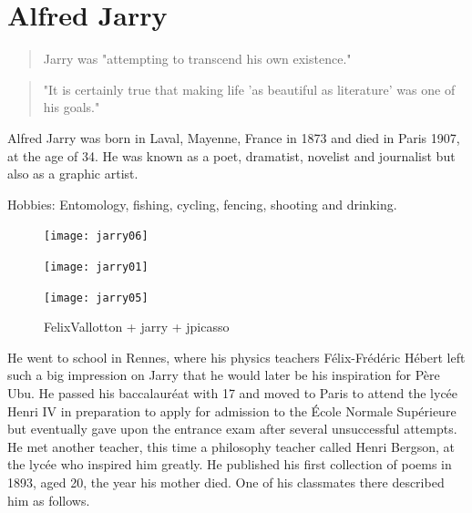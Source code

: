 \section{Alfred Jarry}

\begin{quote}
  Jarry was "attempting to transcend his own existence." \citep{Hugill2012}
\end{quote}

\begin{quote}
  "It is certainly true that making life 'as beautiful as literature' was one of his goals." \citep{Hugill2012}
\end{quote}

Alfred Jarry was born in Laval, Mayenne, France in 1873 and died in Paris 1907, at the age of 34. He was known as a poet, dramatist, novelist and journalist but also as a graphic artist.

Hobbies: Entomology, fishing, cycling, fencing, shooting and drinking.

\begin{figure}[htb]
  \centering
  \begin{minipage}{.275\linewidth}
    \texttt{[image: jarry06]}
  \end{minipage}
  \hspace{.05\linewidth}
  \begin{minipage}{.275\linewidth}
    \texttt{[image: jarry01]}
  \end{minipage}
  \hspace{.05\linewidth}
  \begin{minipage}{.275\linewidth}
    \texttt{[image: jarry05]}
  \end{minipage}
  \caption[figures1-3]{FelixVallotton + jarry + jpicasso}
  \label{img123}
\end{figure}

He went to school in Rennes, where his physics teachers Félix-Frédéric Hébert left such a big impression on Jarry that he would later be his inspiration for Père Ubu. He passed his baccalauréat with 17 and moved to Paris to attend the lycée Henri IV in preparation to apply for admission to the École Normale Supérieure but eventually gave upon the entrance exam after several unsuccessful attempts. He met another teacher, this time a philosophy teacher called Henri Bergson, at the lycée who inspired him greatly. He published his first collection of poems in 1893, aged 20, the year his mother died. One of his classmates there described him as follows.

